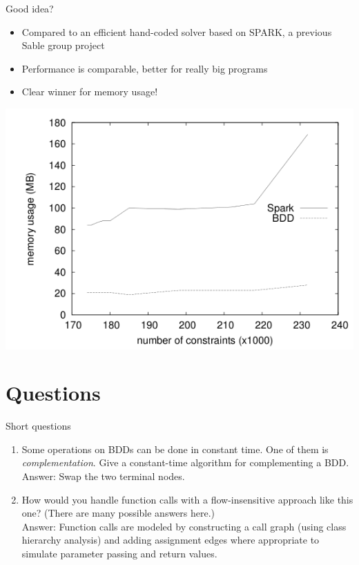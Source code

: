 \documentclass{beamer}
\begin{document}
\begin{frame}{Good idea?}
\begin{itemize}
\item Compared to an efficient hand-coded solver based on SPARK, a previous
Sable group project
\item Performance is comparable, better for really big programs
\item Clear winner for memory usage!
\end{itemize}
\includegraphics[scale=0.25]{performance.png}
\end{frame}

\section{Questions}
\begin{frame}{Short questions}
\begin{enumerate}
\item Some operations on BDDs can be done in constant time. One of them is
\emph{complementation}. Give a constant-time algorithm for complementing a
BDD. \\
\pause
Answer: Swap the two terminal nodes.
\pause
\item How would you handle function calls with a flow-insensitive approach
like this one? (There are many possible answers here.) \\
\pause
Answer: Function calls are modeled by constructing a call graph (using
class hierarchy analysis) and adding assignment edges where appropriate to
simulate parameter passing and return values.
\end{enumerate}
\end{frame}
\end{document}
